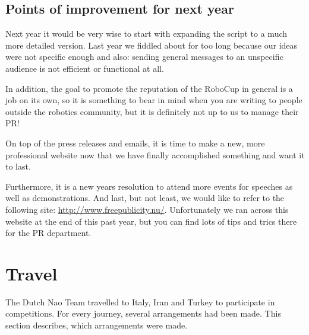 \documentclass[11pt,a4paper,oneside]{article}
\begin{document}
\subsection{Points of improvement for next year}
Next year it would be very wise to start with expanding the script to a much more detailed version. Last year we fiddled about for too long because our ideas were not specific enough and also: sending general messages to an unspecific audience is not efficient or functional at all. 

In addition, the goal to promote the reputation of the RoboCup in general is a job on its own, so it is something to bear in mind when you are writing to people outside the robotics community, but it is definitely not up to us to manage their PR!

On top of the press releases and emails, it is time to make a new, more professional website now that we have finally accomplished something and want it to last.

Furthermore, it is a new years resolution to attend more events for speeches as well as demonstrations.
And last, but not least, we would like to refer to the following site: \url{http://www.freepublicity.nu/}. Unfortunately we ran across this website at the end of this past year, but you can find lots of tips and trics there for the PR department.

\section{Travel}
The Dutch Nao Team travelled to Italy, Iran and Turkey to participate in competitions. For every journey, several arrangements had been made. This section describes, which arrangements were made.

\end{document}
